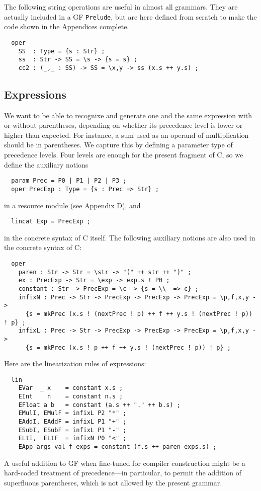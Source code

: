 \documentclass[12pt]{article}
\begin{document}
The following string operations are useful in almost
all grammars. They are actually included in a GF \texttt{Prelude},
but are here defined from scratch to make the code shown in
the Appendices complete.
\begin{verbatim}
  oper
    SS  : Type = {s : Str} ;
    ss  : Str -> SS = \s -> {s = s} ;
    cc2 : (_,_ : SS) -> SS = \x,y -> ss (x.s ++ y.s) ;
\end{verbatim}



\subsection{Expressions}

We want to be able to recognixe and generate one and the same expression with
or without parentheses, depending on whether its precedence level
is lower or higher than expected. For instance, a sum used as
an operand of multiplication should be in parentheses. We
capture this by defining a parameter type of
precedence levels. Four levels are enough for the present
fragment of C, so we define the auxiliary notions
\begin{verbatim}
  param Prec = P0 | P1 | P2 | P3 ;
  oper PrecExp : Type = {s : Prec => Str} ;
\end{verbatim}
in a resource module (see Appendix D), and
\begin{verbatim}
  lincat Exp = PrecExp ;
\end{verbatim}
in the concrete syntax of C itself. The following auxiliary notions
are also used in the concrete syntax of C:
\begin{verbatim}
  oper
    paren : Str -> Str = \str -> "(" ++ str ++ ")" ;
    ex : PrecExp -> Str = \exp -> exp.s ! P0 ;
    constant : Str -> PrecExp = \c -> {s = \\_ => c} ;
    infixN : Prec -> Str -> PrecExp -> PrecExp -> PrecExp = \p,f,x,y ->
      {s = mkPrec (x.s ! (nextPrec ! p) ++ f ++ y.s ! (nextPrec ! p)) ! p} ;
    infixL : Prec -> Str -> PrecExp -> PrecExp -> PrecExp = \p,f,x,y ->
      {s = mkPrec (x.s ! p ++ f ++ y.s ! (nextPrec ! p)) ! p} ;
\end{verbatim}
Here are the linearization rules of expressions:
\begin{verbatim}
  lin
    EVar  _ x    = constant x.s ;
    EInt    n    = constant n.s ;
    EFloat a b   = constant (a.s ++ "." ++ b.s) ;
    EMulI, EMulF = infixL P2 "*" ;
    EAddI, EAddF = infixL P1 "+" ;
    ESubI, ESubF = infixL P1 "-" ;
    ELtI,  ELtF  = infixN P0 "<" ;
    EApp args val f exps = constant (f.s ++ paren exps.s) ;
\end{verbatim}
A useful addition to GF when fine-tuned for compiler
construction might be a hard-coded treatment of
precedence---in particular, to permit the addition
of superfluous parentheses, which is not allowed by
the present grammar.
\end{document}
